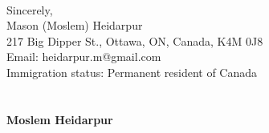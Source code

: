 \documentclass[12pt,oneside]{book}
\begin{document}
%
\vspace*{1\baselineskip}
\phantom \quad \\
Sincerely,\\[0.2cm]
Mason (Moslem) Heidarpur\\
217 Big Dipper St., Ottawa, ON, Canada, K4M 0J8\\
Email: heidarpur.m@gmail.com\\
Immigration status: Permanent resident of Canada\\[-0.1cm]
\newpage
\lhead{\textcolor{gray}{Curriculum vitae}}
\large \bf \hphantom \\ \\ 
 {\selectfont Moslem Heidarpur} \mdseries \normalsize \\ \\ 
\end{document}
